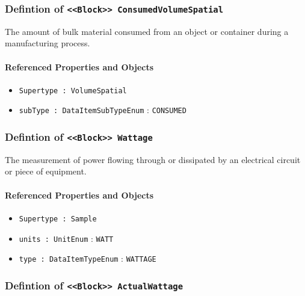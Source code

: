 \subsubsection{Defintion of \texttt{<<Block>> ConsumedVolumeSpatial}}
  \label{type:ConsumedVolumeSpatial}

\FloatBarrier

The amount of bulk material consumed from an object or container during a manufacturing process.

\FloatBarrier
\paragraph{Referenced Properties and Objects}

\begin{itemize}
\item \texttt{Supertype : VolumeSpatial}

\item \texttt{subType : DataItemSubTypeEnum} : \texttt{CONSUMED}

\end{itemize}
\FloatBarrier
\subsubsection{Defintion of \texttt{<<Block>> Wattage}}
  \label{type:Wattage}

\FloatBarrier

The measurement of power flowing through or dissipated by an electrical circuit or piece of equipment.

\FloatBarrier
\paragraph{Referenced Properties and Objects}

\begin{itemize}
\item \texttt{Supertype : Sample}

\item \texttt{units : UnitEnum} : \texttt{WATT}

\item \texttt{type : DataItemTypeEnum} : \texttt{WATTAGE}

\end{itemize}
\FloatBarrier
\subsubsection{Defintion of \texttt{<<Block>> ActualWattage}}
  \label{type:ActualWattage}

